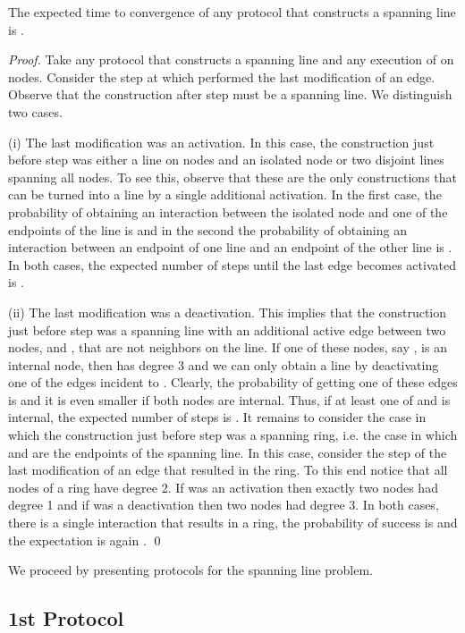 \documentclass[oribibl, 11pt]{llncs}
\begin{document}
\begin{theorem} 
The expected time to convergence of any protocol that constructs a spanning line is .
\end{theorem}
\begin{proof}
Take any protocol  that constructs a spanning line and any execution of  on  nodes. Consider the step  at which  performed the last modification of an edge. Observe that the construction after step  must be a spanning line. We distinguish two cases. 

(i) The last modification was an activation. In this case, the construction just before step  was either a line on  nodes and an isolated node or two disjoint lines spanning all nodes. To see this, observe that these are the only constructions that can be turned into a line by a single additional activation. In the first case, the probability of obtaining an interaction between the isolated node and one of the endpoints of the line is  and in the second the probability of obtaining an interaction between an endpoint of one line and an endpoint of the other line is . In both cases, the expected number of steps until the last edge becomes activated is . 

(ii) The last modification was a deactivation. This implies that the construction just before step  was a spanning line with an additional active edge between two nodes,  and , that are not neighbors on the line. If one of these nodes, say , is an internal node, then  has degree 3 and we can only obtain a line by deactivating one of the edges incident to . Clearly, the probability of getting one of these edges is  and it is even smaller if both nodes are internal. Thus, if at least one of  and  is internal, the expected number of steps is . It remains to consider the case in which the construction just before step  was a spanning ring, i.e. the case in which  and  are the endpoints of the spanning line. In this case, consider the step  of the last modification of an edge that resulted in the ring. To this end notice that all nodes of a ring have degree 2. If  was an activation then exactly two nodes had degree 1 and if  was a deactivation then two nodes had degree 3. In both cases, there is a single interaction that results in a ring, the probability of success is  and the expectation is again . 
\qed
\end{proof}

We proceed by presenting protocols for the spanning line problem.

\subsection{1st Protocol}
\label{subsec:simple-global-line}
\end{document}
